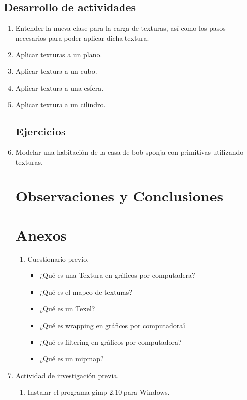 \documentclass[11pt, english]{article}
\begin{document}
\subsection{Desarrollo de actividades}
\begin{enumerate}
\item Entender la nueva clase para la carga de texturas, así como los pasos necesarios
para poder aplicar dicha textura.
\item Aplicar texturas a un plano.
\item Aplicar textura a un cubo.
\item Aplicar textura a una esfera.
\item Aplicar textura a un cilindro.

\subsection{Ejercicios}
\item Modelar una habitación de la casa de bob sponja con primitivas utilizando texturas.
\section{Observaciones y Conclusiones}
\section{Anexos}
\begin{enumerate}
\item Cuestionario previo.
\begin{itemize}
\item ¿Qué es una Textura en gráficos por computadora?
\item ¿Qué es el mapeo de texturas?
\item ¿Qué es un Texel?
\item ¿Qué es wrapping en gráficos por computadora?
\item ¿Qué es filtering en gráficos por computadora?
\item ¿Qué es un mipmap?
\end{itemize}
\end{enumerate}
\item Actividad de investigación previa.
\begin{enumerate}
\item Instalar el programa gimp 2.10 para Windows.
\end{enumerate}
\end{enumerate}

\end{document}
